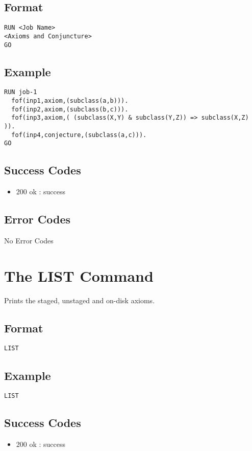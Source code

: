 \subsection{Format}
\begin{lstlisting}
RUN <Job Name>
<Axioms and Conjuncture>
GO
\end{lstlisting}
\subsection{Example}
\begin{lstlisting}
RUN job-1
  fof(inp1,axiom,(subclass(a,b))).
  fof(inp2,axiom,(subclass(b,c))).
  fof(inp3,axiom,( (subclass(X,Y) & subclass(Y,Z)) => subclass(X,Z) )).
  fof(inp4,conjecture,(subclass(a,c))).
GO
\end{lstlisting}
\subsection{Success Codes}
\begin{itemize}
    \item 200 ok : success
\end{itemize}
\subsection{Error Codes}
No Error Codes
\clearpage

\section{The LIST Command}
Prints the staged, unstaged and on-disk axioms.
\subsection{Format}
\begin{lstlisting}
LIST
\end{lstlisting}
\subsection{Example}
\begin{lstlisting}
LIST
\end{lstlisting}
\subsection{Success Codes}
\begin{itemize}
    \item 200 ok : success
\end{itemize}
